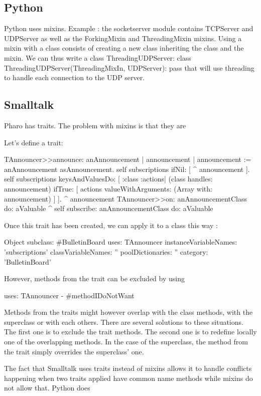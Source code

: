 \documentclass[12pt,a4paper]{scrartcl}
\begin{document}
\begin{multicols}{2}
\subsection{Python}
Python uses mixins.
Example : the socketserver module contains TCPServer and UDPServer as well as the ForkingMixin and ThreadingMixin mixins. Using a mixin with a class consists of creating a new class inheriting the class and the mixin. We can thus write a class ThreadingUDPServer:
class ThreadingUDPServer(ThreadingMixIn, UDPServer): pass
that will use threading to handle each connection to the UDP server.

\subsection{Smalltalk}
Pharo has traits. The problem with mixins is that they are 

Let's define a trait:
\begin{ST}
TAnnouncer>>announce: anAnnouncement
    | announcement |
    announcement := anAnnouncement asAnnouncement.
    self subscriptions ifNil: [ ^ announcement ].
    self subscriptions keysAndValuesDo: [ :class :actions|
        (class handles: announcement) 
            ifTrue: [ actions valueWithArguments: (Array with: announcement) ] ].
    ^ announcement
TAnnouncer>>on: anAnnouncementClass do: aValuable
    ^ self subscribe: anAnnouncementClass do: aValuable
\end{ST}


Once this trait has been created, we can apply it to a class this way : 
\begin{ST}
Object subclass: #BulletinBoard
    uses: TAnnouncer
    instanceVariableNames: 'subscriptions'
    classVariableNames: ''
    poolDictionaries: ''
    category: 'BulletinBoard'
\end{ST}

However, methods from the trait can be excluded by using 
\begin{ST}
uses: TAnnouncer - {#methodIDoNotWant}
\end{ST}

Methods from the traits might however overlap with the class methods, with the superclass or with each others. There are several solutions to these situations. The first one is to exclude the trait methods. The second one is to redefine locally one of the overlapping methods. In the case of the superclass, the method from the trait simply overrides the superclass' one.

The fact that Smalltalk uses traits instead of mixins allows it to handle conflicts happening when two traits applied have common name methods while mixins do not allow that.
Python does 


\end{multicols}
\end{document}
